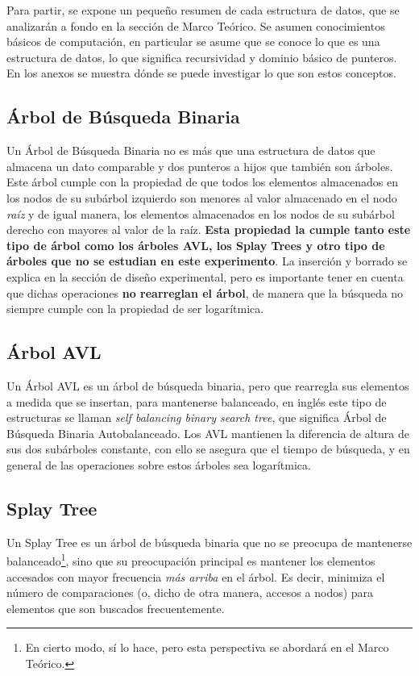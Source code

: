 \documentclass[12pt,letterpaper]{report}
\begin{document}
Para partir, se expone un pequeño resumen de cada estructura de datos, que se analizarán a fondo en la sección de Marco Teórico. Se asumen conocimientos básicos de computación, en particular se asume que se conoce lo que es una estructura de datos, lo que significa recursividad y dominio básico de punteros. En los anexos se muestra dónde se puede investigar lo que son estos conceptos.\\

\subsection{Árbol de Búsqueda Binaria}
\label{subsec:expl_abb}

Un Árbol de Búsqueda Binaria no es más que una estructura de datos que almacena un dato comparable y dos punteros a hijos que también son árboles. Este árbol cumple con la propiedad de que todos los elementos almacenados en los nodos de su subárbol izquierdo son menores al valor almacenado en el nodo \emph{raíz} y de igual manera, los elementos almacenados en los nodos de su subárbol derecho con mayores al valor de la raíz. \textbf{Esta propiedad la cumple tanto este tipo de árbol como los árboles AVL, los Splay Trees y otro tipo de árboles que no se estudian en este experimento}. La inserción y borrado se explica en la sección de diseño experimental, pero es importante tener en cuenta que dichas operaciones \textbf{no rearreglan el árbol}, de manera que la búsqueda no siempre cumple con la propiedad de ser logarítmica.

\subsection{Árbol AVL}
\label{subsec:expl_avl}
Un Árbol AVL es un árbol de búsqueda binaria, pero que rearregla sus elementos a medida que se insertan, para mantenerse balanceado, en inglés este tipo de estructuras se llaman \emph{self balancing binary search tree}, que significa Árbol de Búsqueda Binaria Autobalanceado. Los AVL mantienen la diferencia de altura de sus dos subárboles constante, con ello se asegura que el tiempo de búsqueda, y en general de las operaciones sobre estos árboles sea logarítmica.

\subsection{Splay Tree}
\label{subsec:expl_splay}

Un Splay Tree es un árbol de búsqueda binaria que no se preocupa de mantenerse balanceado\footnote{En cierto modo, sí lo hace, pero esta perspectiva se abordará en el Marco Teórico.}, sino que su preocupación principal es mantener los elementos accesados con mayor frecuencia \emph{más arriba} en el árbol. Es decir, minimiza el número de comparaciones (o, dicho de otra manera, accesos a nodos) para elementos que son buscados frecuentemente.
\end{document}
